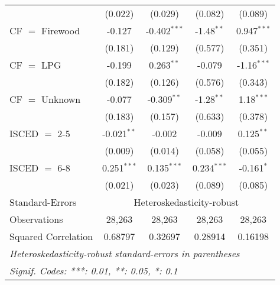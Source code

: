 \begin{table}[htbp!]
\begin{adjustbox}{width = 1\textwidth, max height = 0.95\textheight, center}
\begin{threeparttable}[b]
\begin{tabular}{lcccc}
                                 & (0.022)            & (0.029)            & (0.082)        & (0.089)\\   
            CF $=$ Firewood      & -0.127             & -0.402$^{***}$     & -1.48$^{**}$   & 0.947$^{***}$\\   
                                 & (0.181)            & (0.129)            & (0.577)        & (0.351)\\   
            CF $=$ LPG           & -0.199             & 0.263$^{**}$       & -0.079         & -1.16$^{***}$\\   
                                 & (0.182)            & (0.126)            & (0.576)        & (0.343)\\   
            CF $=$ Unknown       & -0.077             & -0.309$^{**}$      & -1.28$^{**}$   & 1.18$^{***}$\\   
                                 & (0.183)            & (0.157)            & (0.633)        & (0.378)\\   
            ISCED $=$ 2-5        & -0.021$^{**}$      & -0.002             & -0.009         & 0.125$^{**}$\\   
                                 & (0.009)            & (0.014)            & (0.058)        & (0.055)\\   
            ISCED $=$ 6-8        & 0.251$^{***}$      & 0.135$^{***}$      & 0.234$^{***}$  & -0.161$^{*}$\\   
                                 & (0.021)            & (0.023)            & (0.089)        & (0.085)\\   
            \midrule 
            Standard-Errors & \multicolumn{4}{c}{Heteroskedasticity-robust} \\ 
            Observations         & 28,263             & 28,263             & 28,263         & 28,263\\  
            Squared Correlation  & 0.68797            & 0.32697            & 0.28914        & 0.16198\\  
            \midrule \midrule
            \multicolumn{5}{l}{\emph{Heteroskedasticity-robust standard-errors in parentheses}}\\
            \multicolumn{5}{l}{\emph{Signif. Codes: ***: 0.01, **: 0.05, *: 0.1}}\\
         \end{tabular}
         

\end{threeparttable}
\end{adjustbox}
\end{table}
